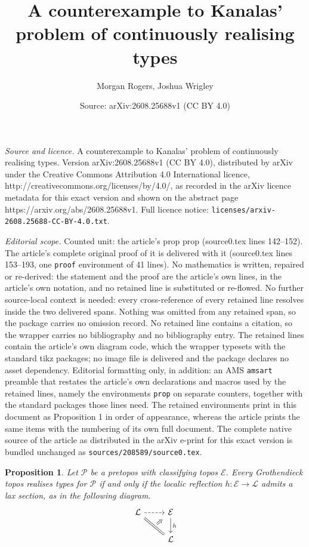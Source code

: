 \documentclass[10pt,a4paper]{amsart}
\title{A counterexample to Kanalas' problem of continuously realising types}
\author{Morgan Rogers, Joshua Wrigley}
\date{Source: arXiv:2608.25688v1 (CC BY 4.0)}
\newtheorem{prop}{Proposition}
\newcommand{\locrefl}{\mathcal{L}}
\newcommand{\pretopos}{\mathcal{P}}
\newcommand{\topos}{\mathcal{E}}
\begin{document}
\maketitle

\noindent\emph{Source and licence.} A counterexample to Kanalas' problem of continuously realising types. Version arXiv:2608.25688v1 (CC BY 4.0), distributed by arXiv under the Creative Commons Attribution 4.0 International licence, http://creativecommons.org/licenses/by/4.0/, as recorded in the arXiv licence metadata for this exact version and shown on the abstract page https://arxiv.org/abs/2608.25688v1. Full licence notice: \texttt{licenses/arxiv-2608.25688-CC-BY-4.0.txt}.\par\smallskip

\noindent\textit{Editorial scope.} Counted unit: the article's prop prop (source0.tex lines 142--152). The article's complete original proof of it is delivered with it (source0.tex lines 153--193, one \texttt{proof} environment of 41 lines). No mathematics is written, repaired or re-derived: the statement and the proof are the article's own lines, in the article's own notation, and no retained line is substituted or re-flowed.  No further source-local context is needed: every cross-reference of every retained line resolves inside the two delivered spans.  Nothing was omitted from any retained span, so the package carries no omission record.  No retained line contains a citation, so the wrapper carries no bibliography and no bibliography entry.  The retained lines contain the article's own diagram code, which the wrapper typesets with the standard tikz packages; no image file is delivered and the package declares no asset dependency.  Editorial formatting only, in addition: an AMS \texttt{amsart} preamble that restates the article's own declarations and macros used by the retained lines, namely the environments \texttt{prop} on separate counters, together with the standard packages those lines need.  The retained environments print in this document as Proposition 1 in order of appearance, whereas the article prints the same items with the numbering of its own full document.  The complete native source of the article as distributed in the arXiv e-print for this exact version is bundled unchanged as \texttt{sources/208589/source0.tex}.
	\begin{prop}
		Let $\pretopos$ be a pretopos with classifying topos $\topos$.  Every Grothendieck topos realises types for $\pretopos$ if and only if the localic reflection $h \colon \topos \to \locrefl$ admits a lax section, as in the following diagram.
		\[\begin{tikzcd}
			\locrefl & \topos \\
			& \locrefl
			\arrow[dashed, from=1-1, to=1-2]
			\arrow[""{name=0, anchor=center, inner sep=0}, equals, from=1-1, to=2-2]
			\arrow["h", from=1-2, to=2-2]
			\arrow["\Rightarrow"{marking, allow upside down}, draw=none, from=0, to=1-2]
		\end{tikzcd}\]
	\end{prop}
\end{document}
